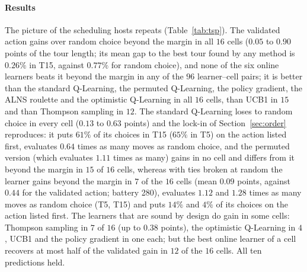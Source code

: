 \paragraph{Results} The picture of the scheduling hosts repeats (Table~\ref{tab:tsp}). The validated action gains over random choice beyond the margin in all $16$ cells ($0.05$ to $0.90$ points of the tour length; its mean gap to the best tour found by any method is $0.26\%$ in T15, against $0.77\%$ for random choice), and none of the six online learners beats it beyond the margin in any of the $96$ learner--cell pairs; it is better than the standard Q-Learning, the permuted Q-Learning, the policy gradient, the ALNS roulette and the optimistic Q-Learning in all $16$ cells, than UCB1 in $15$ and than Thompson sampling in $12$. The standard Q-Learning loses to random choice in every cell ($0.13$ to $0.63$ points) and the lock-in of Section~\ref{sec:order} reproduces: it puts $61\%$ of its choices in T15 ($65\%$ in T5) on the action listed first, evaluates $0.64$ times as many moves as random choice, and the permuted version (which evaluates $1.11$ times as many) gains in no cell and differs from it beyond the margin in $15$ of $16$ cells, whereas with ties broken at random the learner gains beyond the margin in $7$ of the $16$ cells (mean $0.09$ points, against $0.44$ for the validated action; battery 280), evaluates $1.12$ and $1.28$ times as many moves as random choice (T5, T15) and puts $14\%$ and $4\%$ of its choices on the action listed first. The learners that are sound by design do gain in some cells: Thompson sampling in $7$ of $16$ (up to $0.38$ points), the optimistic Q-Learning in $4$, UCB1 and the policy gradient in one each; but the best online learner of a cell recovers at most half of the validated gain in $12$ of the $16$ cells. All ten predictions held.

